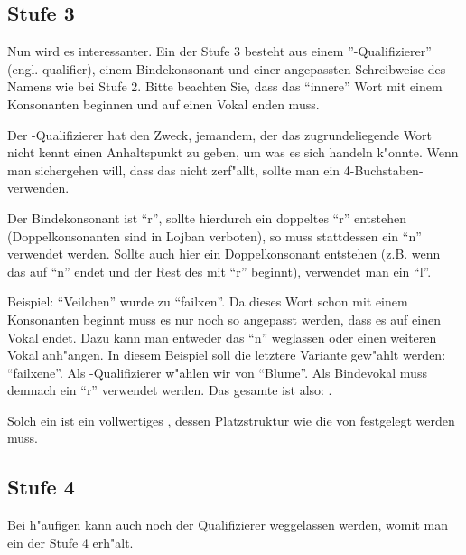\subsection{Stufe 3}
Nun wird es interessanter. Ein  der Stufe 3 besteht aus einem ''-Qualifizierer'' (engl.  qualifier),
einem Bindekonsonant und einer angepassten Schreibweise des Namens wie bei Stufe 2. Bitte beachten Sie, dass das ``innere'' 
Wort mit einem Konsonanten beginnen und auf einen Vokal enden muss.

Der -Qualifizierer hat den Zweck, jemandem, der das zugrundeliegende Wort nicht kennt einen Anhaltspunkt zu geben,
um was es sich handeln k"onnte. Wenn man sichergehen will, dass das  nicht zerf"allt, sollte man ein 4-Buchstaben- verwenden.

Der Bindekonsonant ist ``r'', sollte hierdurch ein doppeltes ``r'' entstehen (Doppelkonsonanten sind in Lojban verboten), so
muss stattdessen ein ``n'' verwendet werden. Sollte auch hier ein Doppelkonsonant entstehen (z.B. wenn das  auf ``n''
endet und der Rest des  mit ``r'' beginnt), verwendet man ein ``l''.

Beispiel: ``Veilchen'' wurde zu ``failxen''. Da dieses Wort schon mit einem Konsonanten beginnt muss es nur noch so angepasst
werden, dass es auf einen Vokal endet. Dazu kann man entweder das ``n'' weglassen oder einen weiteren Vokal anh"angen. In diesem
Beispiel soll die letztere Variante gew"ahlt werden: ``failxene''.
Als -Qualifizierer w"ahlen wir  von  ``Blume''.
Als Bindevokal muss demnach ein ``r'' verwendet werden. Das gesamte  ist also: .

Solch ein  ist ein vollwertiges , dessen Platzstruktur wie die von  festgelegt werden muss.

\subsection{Stufe 4}
Bei h"aufigen  kann auch noch der Qualifizierer weggelassen werden, womit man ein  der Stufe 4 erh"alt.
